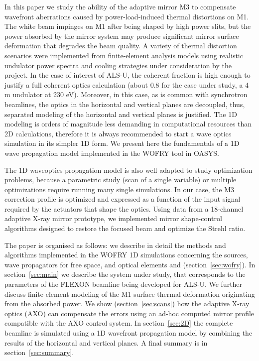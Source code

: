 \documentclass{iucr}
\begin{document}
In this paper we study the ability of the adaptive mirror M3 to compensate wavefront aberrations caused by power-load-induced thermal distortions on M1. The white beam impinges on M1 after being shaped by high power slits, but the power absorbed by the mirror system may produce significant mirror surface deformation that degrades the beam quality. 
A variety of thermal distortion scenarios were implemented from finite-element analysis models using realistic undulator power spectra and cooling strategies under consideration by the project.
In the case of interest of ALS-U, the coherent fraction is high enough to justify a full coherent optics calculation (about 0.8 for the case under study, a 4 m undulator at 230 eV). Moreover, in this case, as is common with synchrotron beamlines, the optics in the horizontal and vertical planes are decoupled, thus, separated modeling of the horizontal and vertical planes is justified. The 1D modeling is orders of magnitude less demanding in computational resources than 2D calculations, therefore it is always recommended to start a wave optics simulation in its simpler 1D form. We present here the fundamentals of a 1D wave propagation model implemented in the WOFRY \cite{codeWOFRY} tool in OASYS. 

The 1D waveoptics propagation model is also well adapted to study optimization problems, because a parametric study (scan of a single variable) or multiple optimizations require running many single simulations. In our case, the M3 correction profile is optimized and expressed as a function of the input signal required by the actuators that shape the optics. 
Using data from a 18-channel adaptive X-ray mirror prototype, we implemented mirror shape-control algorithms designed to restore the focused beam and optimize the Strehl ratio.

The paper is organised as follows: we describe in detail the methods and algorithms implemented in the WOFRY 1D simulations concerning the sources, wave propagators for free space, and optical elements and (section~\ref{sec:wofry}). In section~\ref{sec:main} we describe the system under study, that corresponds to the parameters of the FLEXON beamline being developed for ALS-U. We further discuss finite-element modeling of the M1 surface thermal deformation originating from the absorbed power. We show (section~\ref{sec:scans}) how the adaptive X-ray optics (AXO) can compensate the errors using an ad-hoc computed mirror profile compatible with the AXO control system. In section~\ref{sec:2D} the complete beamline is simulated using a 1D wavefront propagation model by combining the results of the horizontal and vertical planes. A final summary is in section~\ref{sec:summary}.
\end{document}
